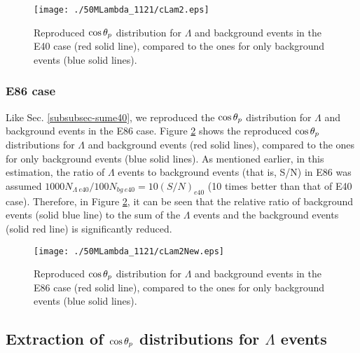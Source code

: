 \begin{figure}[h]
  \centering
  \texttt{[image: ./50MLambda\_1121/cLam2.eps]}
  \caption{Reproduced $\cos{\theta_p}$ distribution for $\Lambda$ and background events in the E40 case (red solid line), compared to the ones for only background events (blue solid lines).}
  \label{fig-cLam2}
\end{figure}

\subsubsection{E86 case}
Like Sec. \ref{subsubsec-sume40}, we reproduced the $\cos{\theta_p}$ distribution for $\Lambda$ and background events in the E86 case. Figure \ref{fig-cLam2New} shows the reproduced $\cos{\theta_p}$ distributions for $\Lambda$ and background events (red solid lines), compared to the ones for only background events (blue solid lines). As mentioned earlier, in this estimation, the ratio of $\Lambda$ events to background events (that is, S/N) in E86 was assumed $1000N_{\Lambda\ e40}/100N_{bg\ e40} = 10(S/N)_{e40}$ (10 times better than that of E40 case). Therefore, in Figure \ref{fig-cLam2New}, it can be seen that the relative ratio of background events (solid blue line) to the sum of the $\Lambda$ events and the background events (solid red line) is significantly reduced.

\begin{figure}[h]
  \centering
  \texttt{[image: ./50MLambda\_1121/cLam2New.eps]}
  \caption{Reproduced $\cos{\theta_p}$ distribution for $\Lambda$ and background events in the E86 case (red solid line), compared to the ones for only background events (blue solid lines).}
  \label{fig-cLam2New}
\end{figure}


\clearpage
\subsection{Extraction of $\cos{\theta_p}$ distributions for $\Lambda$ events}
\label{subsec-randext}

